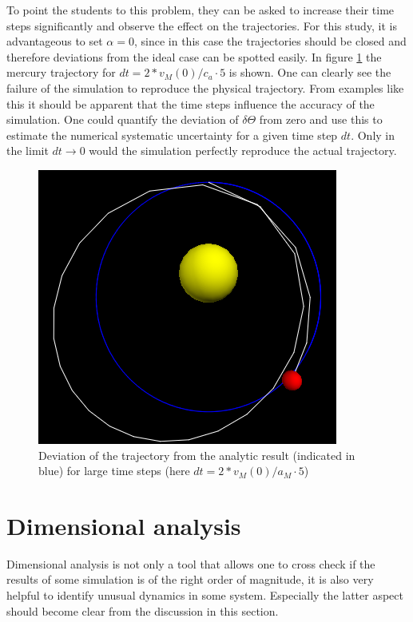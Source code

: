 \documentclass[12pt, UK english]{iopart}
\begin{document}
To point the students to this problem, they can be asked to increase their time steps significantly and observe the effect on the trajectories.
For this study, it is advantageous to set $\alpha =0$, since in this case the trajectories should be closed and therefore deviations from the ideal case can be spotted easily.
In figure \ref{fig: LargeDT} the mercury trajectory for $dt=2 * v_M(0) / c_a \cdot 5$ is shown.
One can clearly see the failure of the simulation to reproduce the physical trajectory.
From examples like this it should be apparent that the time steps influence the accuracy of the simulation.
One could quantify the deviation of $\delta\Theta$ from zero and use this to estimate the numerical systematic uncertainty for a given time step $dt$.
Only in the limit $dt \rightarrow 0$ would the simulation perfectly reproduce the actual trajectory.
\begin{figure}[htb]
	\centering
	\includegraphics[width=.3\textwidth]{figs/TrajectoryLargeDT.png}
	\caption{\label{fig: LargeDT} Deviation of the trajectory from the analytic result (indicated in blue) for large time steps (here $dt=2 * v_M(0) / a_M \cdot 5$)}
\end{figure}

\section{Dimensional analysis}\label{sec:analysis}

Dimensional analysis is not only a tool that allows one to cross check if the results of some simulation is of the right order of magnitude, it is also very helpful to identify unusual dynamics in some system.
Especially the latter aspect should become clear from the discussion in this section.
\end{document}
